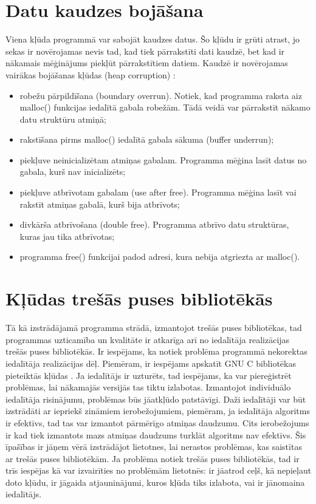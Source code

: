 \section{Datu kaudzes bojāšana}

Viena kļūda programmā var sabojāt kaudzes datus. 
Šo kļūdu ir grūti atrast, jo sekas ir novērojamas nevis tad, kad tiek pārrakstīti dati kaudzē, bet kad ir nākamais mēģinājums piekļūt pārrakstītiem datiem.
Kaudzē ir novērojamas vairākas bojāšanas kļūdas (heap corruption) \cite{DHC}:
\begin{itemize}
\item robežu pārpildīšana (boundary overrun). Notiek, kad programma raksta aiz malloc() funkcijas iedalītā gabala robežām.
Tādā veidā var pārrakstīt nākamo datu struktūru atmiņā; 
\item rakstīšana pirms malloc() iedalītā gabala sākuma (buffer underrun);
\item piekļuve neinicializētam atmiņas gabalam. Programma mēģina lasīt datus no gabala, kurš nav inicializēts;
\item piekļuve atbrīvotam gabalam  (use after free). Programma mēģina lasīt vai rakstīt atmiņas gabalā, kurš bija atbrīvots;
\item divkārša atbrīvošana (double free). Programma atbrīvo datu struktūras, kuras jau tika atbrīvotas;
\item programma free() funkcijai padod adresi, kura nebija atgriezta ar malloc().
\end{itemize}



\section{Kļūdas trešās puses bibliotēkās}
Tā kā izstrādājamā programma strādā, izmantojot trešās puses bibliotēkas, tad programmas uzticamība un kvalitāte ir atkarīga arī no iedalītāja realizācijas trešās puses bibliotēkās.
Ir iespējams, ka notiek problēma programmā nekorektas iedalītāja realizācijas dēļ.
Piemēram, ir iespējams apskatīt GNU C bibliotēkas pieteiktās kļūdas \cite{MUE}.
Ja iedalītājs ir uzturēts, tad iespējams, ka var piereģistrēt problēmas, lai nākamajās versijās tas tiktu izlabotas.
Izmantojot individuālo iedalītāja risinājumu, problēmas būs jāatkļūdo patstāvīgi.  
Daži iedalītāji var būt izstrādāti ar iepriekš zināmiem ierobežojumiem, piemēram, ja iedalītāja algoritms ir efektīvs, tad tas var izmantot pārmērīgo atmiņas daudzumu.
Cits ierobežojums ir kad tiek izmantots mazs atmiņas daudzums turklāt algoritms nav efektīvs.
Šis īpašības ir jāņem vērā izstrādājot lietotnes, lai nerastos problēmas, kas saistītas ar trešās puses bibliotēkām.
Ja problēma notiek trešās puses bibliotēkās, tad ir trīs iespējas kā var izvairīties no problēmām lietotnēs: ir jāatrod ceļš, kā nepieļaut doto kļūdu, ir jāgaida atjauninājumi, kuros kļūda tiks izlabota, vai ir jānomaina iedalītājs. 


